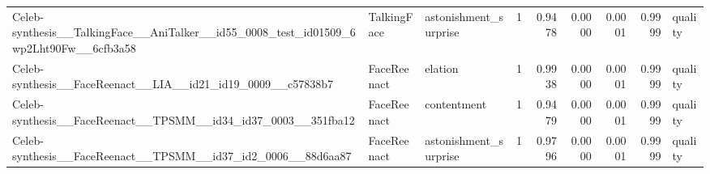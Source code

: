 \begin{tabular}{lllrrrrrl}
Celeb-synthesis__TalkingFace__AniTalker__id55_0008_test_id01509_6wp2Lht90Fw__6cfb3a58 & TalkingFace & astonishment_surprise & 1 & 0.9478 & 0.0000 & 0.0001 & 0.9999 & quality \\
Celeb-synthesis__FaceReenact__LIA__id21_id19_0009__c57838b7 & FaceReenact & elation & 1 & 0.9938 & 0.0000 & 0.0001 & 0.9999 & quality \\
Celeb-synthesis__FaceReenact__TPSMM__id34_id37_0003__351fba12 & FaceReenact & contentment & 1 & 0.9479 & 0.0000 & 0.0001 & 0.9999 & quality \\
Celeb-synthesis__FaceReenact__TPSMM__id37_id2_0006__88d6aa87 & FaceReenact & astonishment_surprise & 1 & 0.9796 & 0.0000 & 0.0001 & 0.9999 & quality \\
\bottomrule
\end{tabular}
